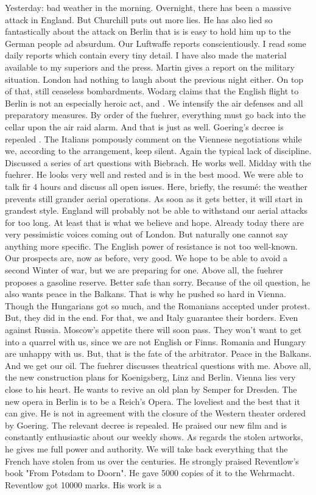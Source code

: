Yesterday: bad weather in the morning. Overnight, there has been a massive attack in England. But Churchill puts out more lies. He has also lied so fantastically about the attack on Berlin that is is easy to hold him up to the German people ad absurdum. Our Luftwaffe reports conscientiously. I read some daily reports which contain every tiny detail. I have also made the material available to my superiors and the press. Martin gives a report on the military situation. London had nothing to laugh about the previous night either.  On top of that, still ceaseless bombardments. Wodarg claims that the English flight to Berlin is not an especially heroic act, and . We intensify the air defenses and all preparatory measures. By order of the fuehrer, everything must go back into the cellar upon the air raid alarm. And that is just as well. Goering's decree is repealed . The Italians pompously comment on the Viennese negotiations while we, according to the arrangement, keep silent. Again the typical lack of discipline. Discussed a series of art questions with Biebrach. He works well. Midday with the fuehrer. He looks very well and rested and is in the best mood. We were able to talk fir 4 hours and discuss all open issues. Here, briefly, the resumé: the weather prevents still grander aerial operations. As soon as it gets better, it will start in grandest style. England will probably not be able to withstand our aerial attacks for too long. At least that is what we believe and hope. Already today there are very pessimistic voices coming out of London. But naturally one cannot say anything more specific. The English power of resistance is not too well-known. Our prospects are, now as before, very good. We hope to be able to avoid a second Winter of war, but we are preparing for one. Above all, the fuehrer proposes a gasoline reserve. Better safe than sorry. Because of the oil question, he also wants peace in the Balkans. That is why he pushed so hard in Vienna. Though the Hungarians got so much, and the Romanians accepted under protest. But, they did in the end. For that, we and Italy guarantee their borders. Even against Russia. Moscow's appetite there will soon pass. They won't want to get into a quarrel with us, since we are not English or Finns. Romania and Hungary are unhappy with us. But, that is the fate of the arbitrator. Peace in the Balkans. And we get our oil. The fuehrer discusses theatrical questions with me. Above all, the new construction plans for Koenigsberg, Linz and Berlin. Vienna lies very close to his heart. He wants to revive an old plan by Semper for Dresden. The new opera in Berlin is to be a Reich's Opera. The loveliest and the best that it can give. He is not in agreement with the closure of the Western theater ordered by Goering. The relevant decree is repealed. He praised our new film and is constantly enthusiastic about our weekly shows. \missing As regards the stolen artworks, he gives me full power and authority. We will take back everything that the French have stolen from us over the centuries. He strongly praised Reventlow's book "From Potsdam to Doorn". He gave 5000 copies of it to the Wehrmacht. Reventlow got 10000 marks. His work is a 